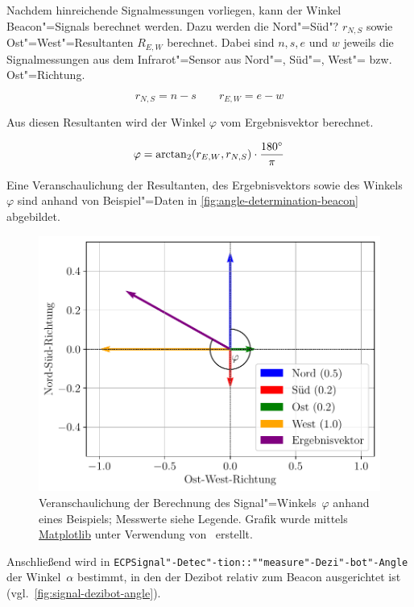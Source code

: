 Nachdem hinreichende Signalmessungen vorliegen, kann der Winkel Beacon"=Signals berechnet werden. Dazu werden die Nord"=Süd"? $r_{N,S}$ sowie Ost"=West"=Resultanten $R_{E,W}$ berechnet. Dabei sind $n,s,e$ und $w$ jeweils die Signalmessungen aus dem Infrarot"=Sensor aus Nord"=, Süd"=, West"= bzw. Ost"=Richtung.

\begin{equation*}
    r_{N,S} = n - s \qquad r_{E,W} = e - w
\end{equation*}

Aus diesen Resultanten wird der Winkel $\varphi$ vom Ergebnisvektor berechnet.

\begin{equation*}
    \varphi = \arctan_2(r_{E,W}, r_{N,S}) \cdot \frac{180^\circ}{\pi}
\end{equation*}

Eine Veranschaulichung der Resultanten, des Ergebnisvektors sowie des Winkels~$\varphi$ sind anhand von Beispiel"=Daten in \autoref{fig:angle-determination-beacon} abgebildet.

\begin{figure}[h]
    \includegraphics[width=\textwidth]{../plot/signal_direction.pdf}
    \caption{Veranschaulichung der Berechnung des Signal"=Winkels~$\varphi$ anhand eines Beispiels; Messwerte siehe Legende. Grafik wurde mittels \href{https://matplotlib.org/}{Matplotlib} unter Verwendung von~\cite{matplotlibdevelopmentteamScaleInvariantAngle} erstellt.}
    \label{fig:angle-determination-beacon}
\end{figure}

Anschließend wird in \texttt{ECPSignal"-Detec"-tion::""measure"-Dezi"-bot"-Angle} der Winkel~$\alpha$ bestimmt, in den der Dezibot relativ zum Beacon ausgerichtet ist (vgl.~\autoref{fig:signal-dezibot-angle}).

